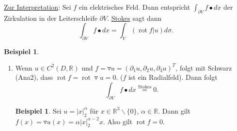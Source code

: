 \documentclass[a4paper]{scrreprt}
\newcommand{\R}{\mathbb{R}}
\newcommand{\jlabel}[1]{\label{j_#1}}
\newcommand{\jshortlink}[1]{\jhyperref{#1}{\text{#1}}}
\newcommand{\jhyperref}[2]{\hyperref[j_#1]{#2}}
\newcommand{\jlink}[1]{\jhyperref{#1}{#1}}
\newcommand{\rot}{\mathop{\mathrm{{rot}}}}
\theoremstyle{plain}
\theoremstyle{definition}
\newtheorem{expl}[thm]{Beispiel}
\newtheorem*{expl*}{Beispiel}
\begin{document}
{{{{\uline{Zur Interpretation}: Sei $f$ ein elektrisches Feld. Dann entspricht $\int_{\partial V} f \bullet dx$ der Zirkulation in der Leiterschleife $\partial V$. \jlink{Stokes} sagt dann
\[
    \int_{\partial V} f \bullet dx = \int_V (\rot f | u)d\sigma.
\]

\jlabel{Bsp 4.23}
\begin{expl}
    \begin{enumerate}
        \item 
            \jlabel{Bsp 4.23a)}
            Wenn $u \in C^2(D, \R)$ und $f = \triangledown u = (\partial_1 u, \partial_2 u, \partial_3 u)^T$, folgt mit Schwarz (Ana2), dass $\rot f = \rot \triangledown u = 0$. ($f$ ist ein Radialfeld). Dann folgt
            \[
                \int_{\partial V} f \bullet dx \overset{\jshortlink{Stokes}}{=} 0.
            \]
            \begin{expl*}
                Sei $u = |x|_2^\alpha$ für $x\in \R^3\backslash \{0\}$, $\alpha \in \R$. Dann gilt $f(x) = \triangledown u(x) = \alpha |x|_2^{\alpha-2}x$. Also gilt $\rot f = 0$.
            \end{expl*}
            

\end{enumerate}
\end{expl}}}}}
\end{document}
